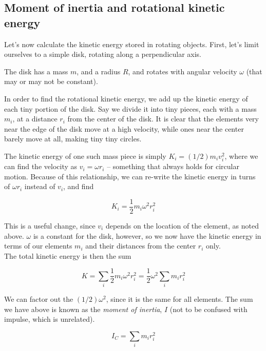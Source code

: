 \subsection{Moment of inertia and rotational kinetic energy}

Let's now calculate the kinetic energy stored in rotating objects. First, let's limit ourselves to a simple disk, rotating along a perpendicular axis.

The disk has a mass $m$, and a radius $R$, and rotates with angular velocity $\omega$ (that may or may not be constant).

In order to find the rotational kinetic energy, we add up the kinetic energy of each tiny portion of the disk. Say we divide it into tiny pieces, each with a mass $m_i$, at a distance $r_i$ from the center of the disk.  It is clear that the elements very near the edge of the disk move at a high velocity, while ones near the center barely move at all, making tiny tiny circles.

The kinetic energy of one such mass piece is simply $\displaystyle K_i = (1/2) m_i v_i^2$, where we can find the velocity as $v_i = \omega r_i$ -- something that always holds for circular motion. Because of this relationship, we can re-write the kinetic energy in turns of $\omega r_i$ instead of $v_i$, and find

\begin{equation}
K_i = \frac{1}{2} m_i \omega^2 r_i^2
\end{equation}

This is a useful change, since $v_i$ depends on the location of the element, as noted above. $\omega$ is a constant for the disk, however, so we now have the kinetic energy in terms of our elements $m_i$ and their distances from the center $r_i$ only.\\
The total kinetic energy is then the sum

\begin{equation}
K = \sum_i \frac{1}{2} m_i \omega^2 r_i^2 = \frac{1}{2} \omega^2 \sum_i m_i r_i^2
\end{equation}

We can factor out the $(1/2) \omega^2$, since it is the same for all elements. The sum we have above is known as the \emph{moment of inertia}, $I$ (not to be confused with impulse, which is unrelated).

\begin{equation}
I_C = \sum_i m_i r_i^2
\end{equation}

